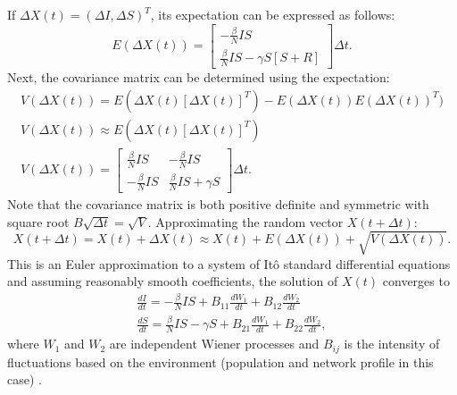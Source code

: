 \noindent If $\Delta X(t)=(\Delta I, \Delta S)^T$, its expectation can be expressed as follows:
\begin{equation}\label{eqn:ISR_Exp}
E(\Delta X(t))=
\begin{bmatrix}
   -\frac{\beta}{N}IS \\
   \frac{\beta}{N}IS - \gamma S[S+R]
\end{bmatrix}
\Delta t. \nonumber
\end{equation}
\noindent Next, the covariance matrix can be determined using the expectation:
\begin{equation}
\left.\begin{aligned}
V(\Delta X(t))= E(\Delta X(t)[\Delta X(t)]^T)-E(\Delta X(t))E(\Delta X(t))^T) \\
V(\Delta X(t)) \approx E(\Delta X(t)[\Delta X(t)]^T) \\
V(\Delta X(t))=
\begin{bmatrix}
   \frac{\beta}{N}IS &
   -\frac{\beta}{N}IS \\
   -\frac{\beta}{N}IS &
   \frac{\beta}{N}IS+\gamma S 
\end{bmatrix}
\Delta t. \nonumber
\end{aligned}\right.
\end{equation}
\noindent Note that the covariance matrix is both positive definite and symmetric with square root $B\sqrt{\Delta t}=\sqrt{V}$. Approximating the random vector $X(t+\Delta t)$:
\begin{equation}
X(t+\Delta t)=X(t)+\Delta X(t) \approx X(t)+E(\Delta X(t))+\sqrt{V(\Delta X(t))}.
\end{equation}
\noindent This is an Euler approximation to a system of It\^o standard differential equations and assuming reasonably smooth coefficients, the solution of $X(t)$ converges to
\begin{equation}
\left.\begin{aligned}
\frac{dI}{dt}=-\frac{\beta}{N}IS+B_{11}\frac{dW_1}{dt}+B_{12}\frac{dW_2}{dt} \\
\frac{dS}{dt}=\frac{\beta}{N}IS-\gamma S+B_{21}\frac{dW_1}{dt}+B_{22}\frac{dW_2}{dt},
\end{aligned}\right.
\end{equation}
\noindent where $W_1$ and $W_2$ are independent Wiener processes and $B_{ij}$ is the intensity of fluctuations based on the environment (population and network profile in this case) \cite{allen2008mathematical}.